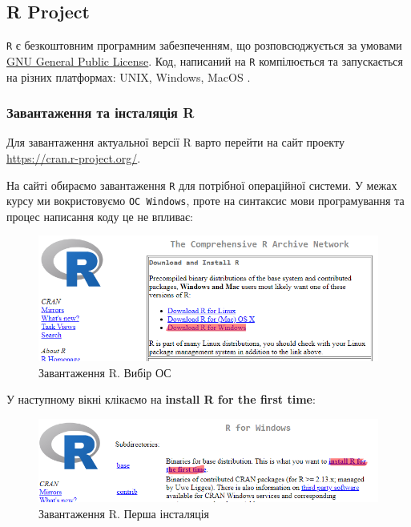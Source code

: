 \documentclass[
]{book}
\begin{document}
\hypertarget{chapter131}{%
\subsection{R Project}\label{chapter131}}

\texttt{R} є безкоштовним програмним забезпеченням, що розповсюджується за умовами \href{https://www.r-project.org/COPYING}{GNU General Public License}. Код, написаний на \texttt{R} компілюється та запускається на різних платформах: UNIX, Windows, MacOS \citep{R-base}.

\hypertarget{chapter1311}{%
\subsubsection{Завантаження та інсталяція R}\label{chapter1311}}

Для завантаження актуальної версії R варто перейти на сайт проекту \url{https://cran.r-project.org/}.

На сайті обираємо завантаження \texttt{R} для потрібної операційної системи. У межах курсу ми вокристовуємо \texttt{ОС\ Windows}, проте на синтаксис мови програмування та процес написання коду це не впливає:

\begin{figure}
\centering
\includegraphics{images/chapter1/r_gui_1.png}
\caption{\label{fig:unnamed-chunk-1}Завантаження R. Вибір ОС}
\end{figure}

У наступному вікні клікаємо на \textbf{install R for the first time}:

\begin{figure}
\centering
\includegraphics{images/chapter1/r_gui_2.png}
\caption{\label{fig:unnamed-chunk-2}Завантаження R. Перша інсталяція}
\end{figure}
\end{document}
